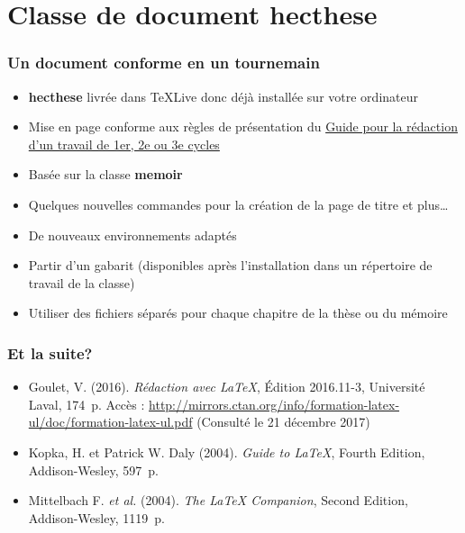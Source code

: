 \section{Classe de document hecthese}


\begin{frame}

	\frametitle{Un document conforme en un tournemain}
	
	\begin{itemize}
		\item \textbf{hecthese} livrée dans \TeX Live donc déjà installée sur votre ordinateur
		\item Mise en page conforme aux règles de présentation du
			\href{http://www.hec.ca/qualitecomm/caf/guide-redaction-travail-cycles.pdf}{%
				Guide pour la rédaction d'un travail de 1er, 2e ou 3e cycles}
		\item Basée sur la classe \textbf{memoir}
		\item Quelques nouvelles commandes pour la création de la page de titre et plus\ldots
		\item De nouveaux environnements adaptés
		\item Partir d’un gabarit (disponibles après l'installation dans un répertoire de travail de 
			la classe)
		\item Utiliser des fichiers séparés pour chaque chapitre de la thèse ou	du mémoire
	\end{itemize}
\end{frame}


\begin{frame}[c]

	\frametitle{Et la suite?}
	
	\begin{itemize}
		\item Goulet, V. (2016). \textit{Rédaction avec {\LaTeX}}, Édition 2016.11-3, Université Laval, 174~p. Accès : \href{http://mirrors.ctan.org/info/formation-latex-ul/doc/formation-latex-ul.pdf}{%
		http://mirrors.ctan.org/info/formation-latex-ul/doc/formation-latex-ul.pdf} (Consulté le 21 décembre 2017)
		\item Kopka, H. et Patrick W. Daly (2004). \textit{Guide to {\LaTeX}}, Fourth Edition, Addison-Wesley, 597~p.
		\item Mittelbach F. \textit{et al.} (2004). \textit{The {\LaTeX} Companion}, Second Edition, Addison-Wesley, 1119~p.
	\end{itemize}
\end{frame}